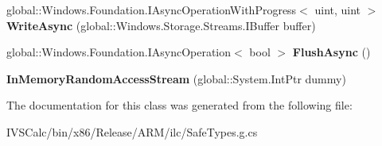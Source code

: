 \begin{DoxyCompactItemize}
\item 
\mbox{\label{class_windows_1_1_storage_1_1_streams_1_1_in_memory_random_access_stream_a812f40b23e43e9921ef7cc08a4bb0a58}} 
global\+::\+Windows.\+Foundation.\+I\+Async\+Operation\+With\+Progress$<$ uint, uint $>$ {\bfseries Write\+Async} (global\+::\+Windows.\+Storage.\+Streams.\+I\+Buffer buffer)
\item 
\mbox{\label{class_windows_1_1_storage_1_1_streams_1_1_in_memory_random_access_stream_a43197e973b559a363116945f30e5a6da}} 
global\+::\+Windows.\+Foundation.\+I\+Async\+Operation$<$ bool $>$ {\bfseries Flush\+Async} ()
\item 
\mbox{\label{class_windows_1_1_storage_1_1_streams_1_1_in_memory_random_access_stream_a58fe83e628070875813e711cb730b9e1}} 
{\bfseries In\+Memory\+Random\+Access\+Stream} (global\+::\+System.\+Int\+Ptr dummy)
\end{DoxyCompactItemize}


The documentation for this class was generated from the following file\+:\begin{DoxyCompactItemize}
\item 
I\+V\+S\+Calc/bin/x86/\+Release/\+A\+R\+M/ilc/Safe\+Types.\+g.\+cs\end{DoxyCompactItemize}

